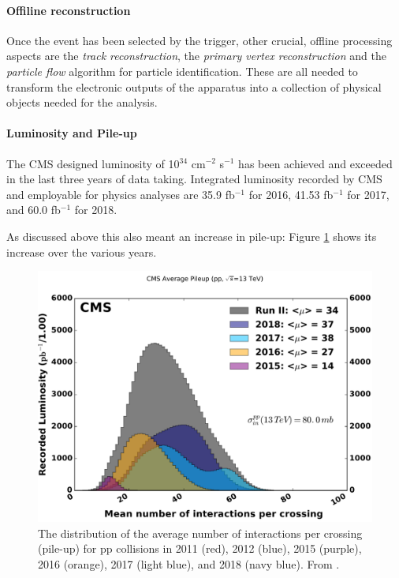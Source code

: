 \paragraph{Offiline reconstruction}
Once the event has been selected by the trigger, other crucial, offline processing aspects are the \emph{track reconstruction}, the \emph{primary vertex reconstruction} and the \emph{particle flow} algorithm for particle identification. These are all needed to transform the electronic outputs of the apparatus into a collection of physical objects needed for the analysis.

\paragraph{Luminosity and Pile-up}

 The CMS designed luminosity of 10$^{34}$ cm$^{-2}$ s$^{-1}$ has been achieved and exceeded in the last three years of data taking. Integrated luminosity recorded by CMS and employable for physics analyses are 35.9 fb$^{-1}$ for 2016, 41.53 fb$^{-1}$ for 2017, and 60.0 fb$^{-1}$ for 2018.

As discussed above this also meant an increase in pile-up: Figure \ref{fig:pileup} shows its increase over the various years.

\begin{figure}
    \centering
     \includegraphics[width=\columnwidth]{gfx/ch1/pileup_allYears_run2.pdf}
    \caption[Pile-up]{The distribution of the average number of interactions per crossing (pile-up) for pp collisions in 2011 (red), 2012 (blue), 2015 (purple), 2016 (orange), 2017 (light blue), and 2018 (navy blue). From \cite{cmspubliclumi}.}
    \label{fig:pileup}
\end{figure}

